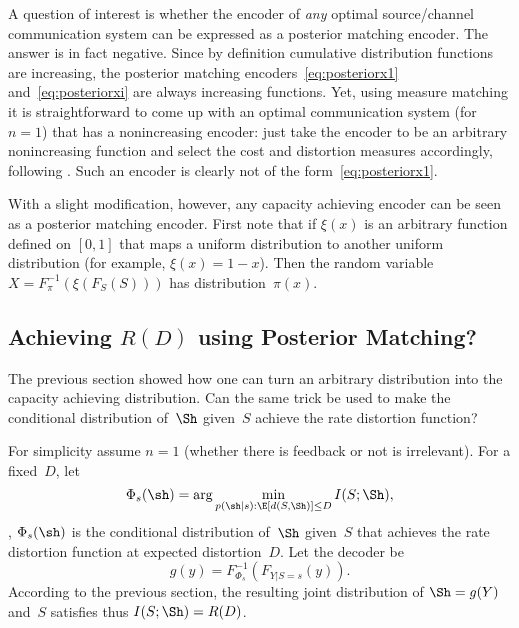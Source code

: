\begin{remark}
  \label{rem:alwaysdistmatch}
  A question of interest is whether the encoder of \emph{any} optimal
  source/channel communication system can be expressed as a posterior matching
  encoder. The answer is in fact negative. Since by definition cumulative
  distribution functions are increasing, the posterior matching
  encoders~\eqref{eq:posteriorx1} and~\eqref{eq:posteriorxi} are always
  increasing functions. Yet, using measure matching it is straightforward to
  come up with an optimal communication system (for $n = 1$) that has a
  nonincreasing encoder: just take the encoder to be an arbitrary nonincreasing
  function and select the cost and distortion measures accordingly, following
  . Such an encoder is clearly not of the
  form~\eqref{eq:posteriorx1}.

  With a slight modification, however, any capacity achieving encoder can be
  seen as a posterior matching encoder. First note that if $\xi(x)$ is an
  arbitrary function defined on $[0,1]$ that maps a uniform distribution to
  another uniform distribution (for example, $\xi(x) = 1 - x$). Then the random
  variable $X = F_{\pi}^{-1}(\xi(F_S(S)))$ has distribution~$\pi(x)$. 
\end{remark}


\subsection{Achieving $R(D)$ using Posterior Matching?}

The previous section showed how one can turn an arbitrary distribution into the
capacity achieving distribution. Can the same trick be used to make the
conditional distribution of~$\Sh$ given~$S$ achieve the rate distortion
function? 

For simplicity assume $n = 1$ (whether there is feedback or not is irrelevant).
For a fixed~$D$, let
\begin{equation*}
  \Phi_s(\sh) = \arg\min_{p(\sh|s): \E[d(S,\Sh)] \le D} I(S;\Sh),
\end{equation*}
\ie, $\Phi_s(\sh)$ is the conditional distribution of~$\Sh$ given~$S$ that
achieves the rate distortion function at expected distortion~$D$. Let the
decoder be
\begin{equation}
  \label{eq:distmatchdec}
  g(y) = F_{\Phi_s}^{-1}(F_{Y|S=s}(y)).
\end{equation}
According to the previous section, the resulting joint distribution of $\Sh =
g(Y)$ and~$S$ satisfies thus $I(S;\Sh) = R(D)$. 

